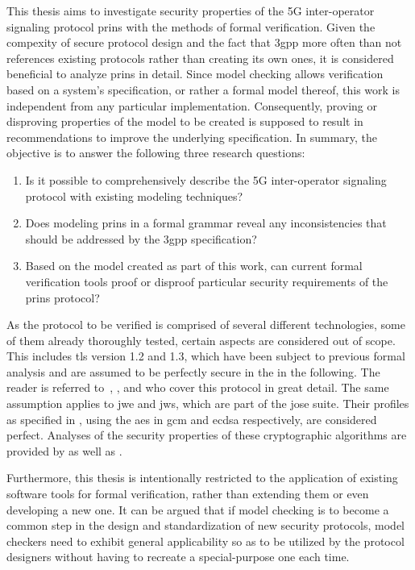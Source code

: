 This thesis aims to investigate security properties of the 5G inter-operator signaling protocol \gls{prins} with the methods of formal verification.
Given the compexity of secure protocol design and the fact that \gls{3gpp} more often than not references existing protocols rather than creating its own ones, it is considered beneficial to analyze \gls{prins} in detail.
Since model checking allows verification based on a system's specification, or rather a formal model thereof, this work is independent from any particular implementation.
Consequently, proving or disproving properties of the model to be created is supposed to result in recommendations to improve the underlying specification.
In summary, the objective is to answer the following three research questions:

\begin{enumerate}[label=(\arabic*)]
    \item Is it possible to comprehensively describe the 5G inter-operator signaling protocol with existing modeling techniques?

    \item Does modeling \gls{prins} in a formal grammar reveal any inconsistencies that should be addressed by the \gls{3gpp} specification?

    \item Based on the model created as part of this work, can current formal verification tools proof or disproof particular security requirements of the \gls{prins} protocol?
\end{enumerate}

As the protocol to be verified is comprised of several different technologies, some of them already thoroughly tested, certain aspects are considered out of scope.
This includes \gls{tls} version 1.2 and 1.3, which have been subject to previous formal analysis and are assumed to be perfectly secure in the in the following.
The reader is referred to~\cite{horvat2015formal}, \cite{cremers2017comprehensive}, and \cite{van2018analysis} who cover this protocol in great detail.
The same assumption applies to \gls{jwe} and \gls{jws}, which are part of the \gls{jose} suite.
Their profiles as specified in \cite{3gpp.33.210}, using the \gls{aes} in \gls{gcm} and \gls{ecdsa} respectively, are considered perfect.
Analyses of the security properties of these cryptographic algorithms are provided by \cite{mcgrew2004security} as well as \cite{fersch2016provable}.

Furthermore, this thesis is intentionally restricted to the application of existing software tools for formal verification, rather than extending them or even developing a new one.
It can be argued that if model checking is to become a common step in the design and standardization of new security protocols, model checkers need to exhibit general applicability so as to be utilized by the protocol designers without having to recreate a special-purpose one each time.

